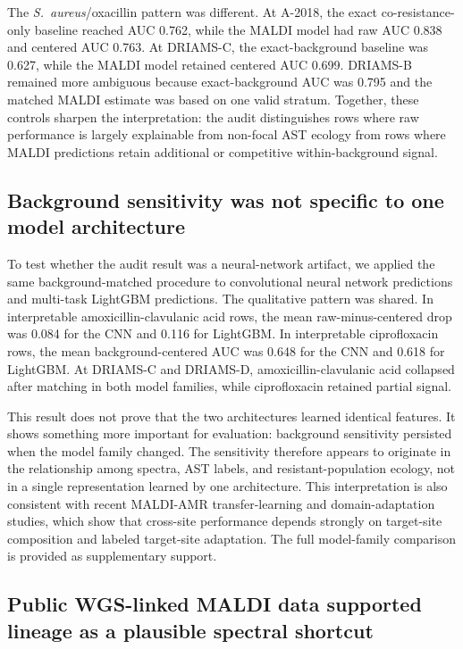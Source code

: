 \documentclass[11pt]{article}
\begin{document}
The \textit{S.~aureus}/oxacillin pattern was different. At A-2018, the exact co-resistance-only baseline reached AUC 0.762, while the MALDI model had raw AUC 0.838 and centered AUC 0.763. At DRIAMS-C, the exact-background baseline was 0.627, while the MALDI model retained centered AUC 0.699. DRIAMS-B remained more ambiguous because exact-background AUC was 0.795 and the matched MALDI estimate was based on one valid stratum. Together, these controls sharpen the interpretation: the audit distinguishes rows where raw performance is largely explainable from non-focal AST ecology from rows where MALDI predictions retain additional or competitive within-background signal.

\subsection*{Background sensitivity was not specific to one model architecture}

To test whether the audit result was a neural-network artifact, we applied the same background-matched procedure to convolutional neural network predictions and multi-task LightGBM predictions. The qualitative pattern was shared. In interpretable amoxicillin-clavulanic acid rows, the mean raw-minus-centered drop was 0.084 for the CNN and 0.116 for LightGBM. In interpretable ciprofloxacin rows, the mean background-centered AUC was 0.648 for the CNN and 0.618 for LightGBM. At DRIAMS-C and DRIAMS-D, amoxicillin-clavulanic acid collapsed after matching in both model families, while ciprofloxacin retained partial signal.

This result does not prove that the two architectures learned identical features. It shows something more important for evaluation: background sensitivity persisted when the model family changed. The sensitivity therefore appears to originate in the relationship among spectra, AST labels, and resistant-population ecology, not in a single representation learned by one architecture. This interpretation is also consistent with recent MALDI-AMR transfer-learning and domain-adaptation studies, which show that cross-site performance depends strongly on target-site composition and labeled target-site adaptation\cite{msdeepamr2024,domainadapt2026}. The full model-family comparison is provided as supplementary support.

\subsection*{Public WGS-linked MALDI data supported lineage as a plausible spectral shortcut}
\end{document}

